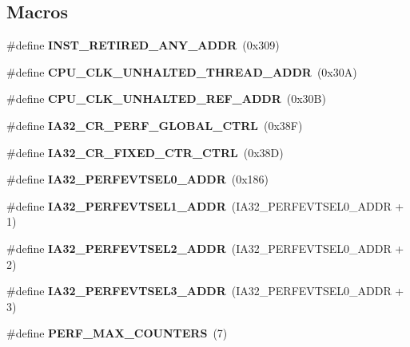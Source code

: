 \subsection*{Macros}
\begin{DoxyCompactItemize}
\item 
\#define {\bfseries I\+N\+S\+T\+\_\+\+R\+E\+T\+I\+R\+E\+D\+\_\+\+A\+N\+Y\+\_\+\+A\+D\+DR}~(0x309)\label{types_8h_abee4b00b55da6bf6f0f037b1b397be92}

\item 
\#define {\bfseries C\+P\+U\+\_\+\+C\+L\+K\+\_\+\+U\+N\+H\+A\+L\+T\+E\+D\+\_\+\+T\+H\+R\+E\+A\+D\+\_\+\+A\+D\+DR}~(0x30\+A)\label{types_8h_a065c692e17728e02e4182e721991ecf1}

\item 
\#define {\bfseries C\+P\+U\+\_\+\+C\+L\+K\+\_\+\+U\+N\+H\+A\+L\+T\+E\+D\+\_\+\+R\+E\+F\+\_\+\+A\+D\+DR}~(0x30\+B)\label{types_8h_a0e8b3248880f64b712ada0ae6cd8057e}

\item 
\#define {\bfseries I\+A32\+\_\+\+C\+R\+\_\+\+P\+E\+R\+F\+\_\+\+G\+L\+O\+B\+A\+L\+\_\+\+C\+T\+RL}~(0x38\+F)\label{types_8h_af75f65880118628dac6b97221eea5f65}

\item 
\#define {\bfseries I\+A32\+\_\+\+C\+R\+\_\+\+F\+I\+X\+E\+D\+\_\+\+C\+T\+R\+\_\+\+C\+T\+RL}~(0x38\+D)\label{types_8h_abd4597ec09d6e135869d4e5e40b4bcb9}

\item 
\#define {\bfseries I\+A32\+\_\+\+P\+E\+R\+F\+E\+V\+T\+S\+E\+L0\+\_\+\+A\+D\+DR}~(0x186)\label{types_8h_a259b1657dd97a573ac9f265a121e5413}

\item 
\#define {\bfseries I\+A32\+\_\+\+P\+E\+R\+F\+E\+V\+T\+S\+E\+L1\+\_\+\+A\+D\+DR}~(I\+A32\+\_\+\+P\+E\+R\+F\+E\+V\+T\+S\+E\+L0\+\_\+\+A\+D\+DR + 1)\label{types_8h_abc4be06ea51529572906dfa1a503b9ec}

\item 
\#define {\bfseries I\+A32\+\_\+\+P\+E\+R\+F\+E\+V\+T\+S\+E\+L2\+\_\+\+A\+D\+DR}~(I\+A32\+\_\+\+P\+E\+R\+F\+E\+V\+T\+S\+E\+L0\+\_\+\+A\+D\+DR + 2)\label{types_8h_a387524f9b226cefe58103a990334e420}

\item 
\#define {\bfseries I\+A32\+\_\+\+P\+E\+R\+F\+E\+V\+T\+S\+E\+L3\+\_\+\+A\+D\+DR}~(I\+A32\+\_\+\+P\+E\+R\+F\+E\+V\+T\+S\+E\+L0\+\_\+\+A\+D\+DR + 3)\label{types_8h_ab4670da4066d99e7761424091bb398ec}

\item 
\#define {\bfseries P\+E\+R\+F\+\_\+\+M\+A\+X\+\_\+\+C\+O\+U\+N\+T\+E\+RS}~(7)\label{types_8h_aed6a86fa515f9e1e01b1809c1d9ecb29}


\end{DoxyCompactItemize}
